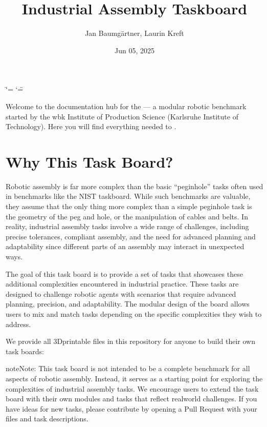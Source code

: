 \documentclass[letterpaper,10pt,english]{sphinxmanual}
\title{Industrial Assembly Taskboard}
\date{Jun 05, 2025}
\author{Jan Baumgärtner, Laurin Kreft}
\begin{document}
\ifdefined\shorthandoff
  \ifnum\catcode`\=\string=\active\shorthandoff{=}\fi
  \ifnum\catcode`\"=\active{}\fi
\fi

\pagestyle{empty}
\sphinxmaketitle
\pagestyle{plain}
\sphinxtableofcontents
\pagestyle{normal}
\label{\detokenize{index::doc}}


\sphinxAtStartPar
Welcome to the documentation hub for the  — a modular robotic
benchmark started by the wbk Institute of Production Science (Karlsruhe Institute
of Technology). Here you will find everything needed to   .


\chapter{Why This Task Board?}
\label{\detokenize{index:why-this-task-board}}
\sphinxAtStartPar
Robotic assembly is far more complex than the basic “peg\sphinxhyphen{}in\sphinxhyphen{}hole” tasks often used in benchmarks like the NIST taskboard.
While such benchmarks are valuable, they assume that the only thing more complex than a simple peg\sphinxhyphen{}in\sphinxhyphen{}hole task is the geometry of the peg and hole,
or the manipulation of cables and belts.
In reality, industrial assembly tasks involve a wide range of challenges, including precise tolerances, compliant assembly,
and the need for advanced planning and adaptability since different parts of an assembly may interact in unexpected ways.

\sphinxAtStartPar
The goal of this task board is to provide a set of tasks that showcases these additional complexities encountered in industrial practice.
These tasks are designed to challenge robotic agents with scenarios that require advanced planning, precision, and adaptability.
The modular design of the board allows users to mix and match tasks depending on the specific complexities they wish to address.

\sphinxAtStartPar
We provide all 3D\sphinxhyphen{}printable files in this repository for anyone to build their own task boards: 

\begin{sphinxadmonition}{note}{Note:}
\sphinxAtStartPar
This task board is not intended to be a complete benchmark for all aspects of robotic assembly.
Instead, it serves as a starting point for exploring the complexities of industrial assembly tasks.
We encourage users to extend the task board with their own modules and tasks that reflect real\sphinxhyphen{}world challenges.
If you have ideas for new tasks, please contribute by opening a Pull Request with your files and task descriptions.
\end{sphinxadmonition}
\end{document}

